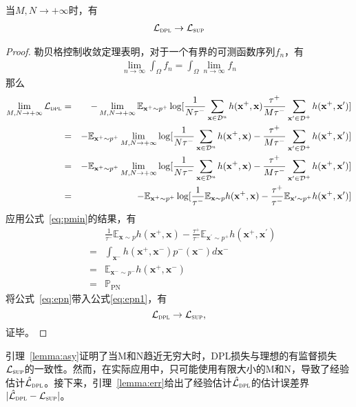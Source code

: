 \begin{lemma}\label{lemma:asy}
当$M,N \rightarrow +\infty$时，有
	\begin{eqnarray}
		\mathcal{L}_\textsc{dpl}  \rightarrow \mathcal{L}_\textsc{sup} 
	\end{eqnarray}
	\begin{proof}
勒贝格控制收敛定理\cite{tao:shi}表明，对于一个有界的可测函数序列$f_n$，有
		\begin{eqnarray}
			\lim\limits_{n\rightarrow \infty} \int_{\Omega} f_n =\int_{\Omega} \lim\limits_{n\rightarrow\infty}f_n \nonumber
		\end{eqnarray}
那么
		\begin{eqnarray}
			\lim\limits_{\substack{M,N \rightarrow +\infty}} \mathcal{L}_\textsc{dpl} 
			&=&-\lim\limits_{\substack{M,N \rightarrow +\infty}} \mathbb{E}_{\mathbf{x}^+\sim p^+}\log [\frac{1}{N\tau^-}
			\sum_{\mathbf{x} \in \mathcal{D}^u}h(\mathbf{x}^+,\mathbf{x})  \frac{\tau^+}{M\tau^-}\sum_{\mathbf{x}^\prime\in \mathcal{D}^+}h(\mathbf{x}^+, \mathbf{x}^\prime)]\nonumber \\
			&=&-\mathbb{E}_{\mathbf{x}^+\sim p^+}\lim\limits_{\substack{M,N \rightarrow +\infty}} \log [\frac{1}{N\tau^-}
			\sum_{\mathbf{x} \in \mathcal{D}^u}h(\mathbf{x}^+,\mathbf{x}) - \frac{\tau^+}{M\tau^-}\sum_{\mathbf{x}^\prime\in \mathcal{D}^+}h(\mathbf{x}^+, \mathbf{x}^\prime)]\nonumber \\
			&=&-\mathbb{E}_{\mathbf{x}^+\sim p^+}\lim\limits_{\substack{M,N \rightarrow +\infty}} \log [\frac{1}{N\tau^-}
			\sum_{\mathbf{x} \in \mathcal{D}^u}h(\mathbf{x}^+,\mathbf{x})  - \frac{\tau^+}{M\tau^-}\sum_{\mathbf{x}^\prime\in \mathcal{D}^+}h(\mathbf{x}^+, \mathbf{x}^\prime)]\nonumber \\
			&=&-\mathbb{E}_{\mathbf{x}^+\sim p^+}\log [\frac{1}{\tau^-}\mathbb{E}_{\mathbf{x}\sim p}h(\mathbf{x}^+,\mathbf{x}) \label{eq:lepn}- \frac{\tau^+}{\tau^-}\mathbb{E}_{\mathbf{x}^\prime\sim p^+}h(\mathbf{x}^+, \mathbf{x}^\prime)] \label{eq:epn1}
		\end{eqnarray}
应用公式~\eqref{eq:pmin}的结果，有
		\begin{eqnarray}
			&&\frac{1}{\tau^-}\mathbb{E}_{\mathbf{x}\sim p}h(\mathbf{x}^+,\mathbf{x}) - \frac{\tau^+}{\tau^-}\mathbb{E}_{\mathbf{x}^\prime\sim p^+}h(\mathbf{x}^+, \mathbf{x}^\prime)\nonumber \\
			&=& \int_\mathbf{x^-}h(\mathbf{x}^+,\mathbf{x}^-)p^-(\mathbf{x}^-)d\mathbf{x}^- \nonumber \\
			&=& \mathbb{E}_{\mathbf{x}^-\sim p^-}h(\mathbf{x}^+,\mathbf{x}^-) \nonumber\\
			&=&\mathbb{P}_\text{PN} \label{eq:epn}
		\end{eqnarray}
将公式~\eqref{eq:epn}带入公式\eqref{eq:epn1}，有
		\[\mathcal{L}_\textsc{dpl}  \rightarrow \mathcal{L}_\textsc{sup},\]
证毕。
	\end{proof}
	
引理~\ref{lemma:asy}证明了当M和N趋近无穷大时，DPL损失与理想的有监督损失$\mathcal{L}_\textsc{sup}$的一致性。然而，在实际应用中，只可能使用有限大小的M和N，导致了经验估计$\hat{\mathcal{L}}_\textsc{dpl}$。接下来，引理~\ref{lemma:err}给出了经验估计$\hat{\mathcal{L}}_\textsc{dpl}$的估计误差界$|\hat{\mathcal{L}}_\textsc{dpl}-\mathcal{L}_\textsc{sup}|$。
\end{lemma}
